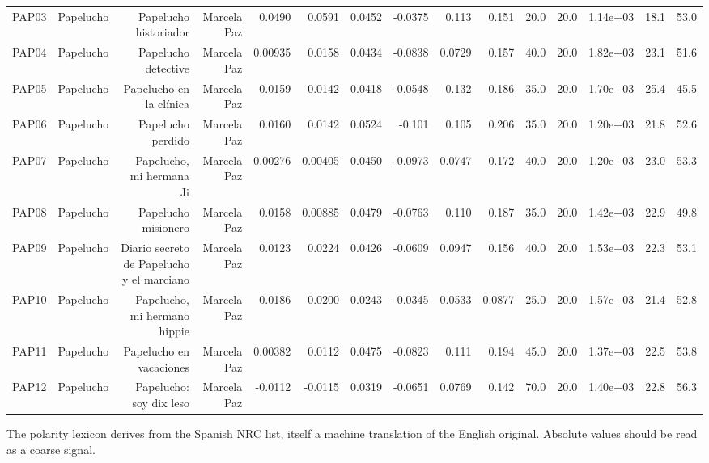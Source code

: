 \begin{table}[htbp]
\begin{tabular}{lrrrrrrrrrrrrrr}
PAP03 & Papelucho & Papelucho historiador & Marcela Paz & 0.0490 & 0.0591 & 0.0452 & -0.0375 & 0.113 & 0.151 & 20.0 & 20.0 & 1.14e+03 & 18.1 & 53.0 \\
PAP04 & Papelucho & Papelucho detective & Marcela Paz & 0.00935 & 0.0158 & 0.0434 & -0.0838 & 0.0729 & 0.157 & 40.0 & 20.0 & 1.82e+03 & 23.1 & 51.6 \\
PAP05 & Papelucho & Papelucho en la clínica & Marcela Paz & 0.0159 & 0.0142 & 0.0418 & -0.0548 & 0.132 & 0.186 & 35.0 & 20.0 & 1.70e+03 & 25.4 & 45.5 \\
PAP06 & Papelucho & Papelucho perdido & Marcela Paz & 0.0160 & 0.0142 & 0.0524 & -0.101 & 0.105 & 0.206 & 35.0 & 20.0 & 1.20e+03 & 21.8 & 52.6 \\
PAP07 & Papelucho & Papelucho, mi hermana Ji & Marcela Paz & 0.00276 & 0.00405 & 0.0450 & -0.0973 & 0.0747 & 0.172 & 40.0 & 20.0 & 1.20e+03 & 23.0 & 53.3 \\
PAP08 & Papelucho & Papelucho misionero & Marcela Paz & 0.0158 & 0.00885 & 0.0479 & -0.0763 & 0.110 & 0.187 & 35.0 & 20.0 & 1.42e+03 & 22.9 & 49.8 \\
PAP09 & Papelucho & Diario secreto de Papelucho y el marciano & Marcela Paz & 0.0123 & 0.0224 & 0.0426 & -0.0609 & 0.0947 & 0.156 & 40.0 & 20.0 & 1.53e+03 & 22.3 & 53.1 \\
PAP10 & Papelucho & Papelucho, mi hermano hippie & Marcela Paz & 0.0186 & 0.0200 & 0.0243 & -0.0345 & 0.0533 & 0.0877 & 25.0 & 20.0 & 1.57e+03 & 21.4 & 52.8 \\
PAP11 & Papelucho & Papelucho en vacaciones & Marcela Paz & 0.00382 & 0.0112 & 0.0475 & -0.0823 & 0.111 & 0.194 & 45.0 & 20.0 & 1.37e+03 & 22.5 & 53.8 \\
PAP12 & Papelucho & Papelucho: soy dix leso & Marcela Paz & -0.0112 & -0.0115 & 0.0319 & -0.0651 & 0.0769 & 0.142 & 70.0 & 20.0 & 1.40e+03 & 22.8 & 56.3 \\
\bottomrule
\end{tabular}
\vspace{0.5em}
\begin{minipage}{\linewidth}\footnotesize The polarity lexicon derives from the Spanish NRC list, itself a machine translation of the English original. Absolute values should be read as a coarse signal.\end{minipage}
\end{table}

